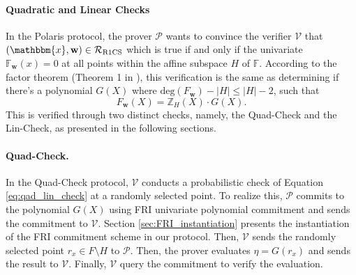 





\paragraph{Quadratic and Linear Checks}\label{linquad}

In the Polaris protocol, the prover $\mathcal{P}$ wants to convince the verifier $\mathcal{V}$ that $(\mathbbm{x},\textbf{w})\in\mathcal{R}_{\mathrm{R1CS}}$ which is true if and only if the univariate  $\mathbb{F}_\textbf{w}(x) = 0$ at all points within the affine subspace $H$ of $\mathbb{F}$. According to the factor theorem (Theorem 1 in \cite{fu2022polaris}), this verification is the same as determining if there's a polynomial $G(X)$ where $\text{deg}(F_\textbf{w}) - |H| \leq |H| - 2$, such that 
\begin{equation}
	F_\textbf{w}(X) = \mathbb{Z}_H(X) \cdot G(X).
	\label{eq:qad_lin_check}
\end{equation}
This is verified through two distinct checks, namely, the Quad-Check and the Lin-Check, as presented in the following sections.



\paragraph{Quad-Check.}\label{quad}

In the Quad-Check protocol, $\mathcal{V}$ conducts a probabilistic check of Equation \eqref{eq:qad_lin_check} at a randomly selected point. To realize this, $\mathcal{P}$ commits to the polynomial $G(X)$ using FRI univariate polynomial commitment and sends the commitment to $\mathcal{V}$. Section \ref{sec:FRI_instantiation} presents the instantiation of the FRI commitment scheme in our protocol. Then, $\mathcal{V}$ sends the randomly selected point $r_x \in F \setminus H$ to $\mathcal{P}$. Then, the prover evaluates $\eta = G (r_x)$ and sends the result to $\mathcal{V}$. Finally, $\mathcal{V}$ query the commitment to verify the evaluation. 

